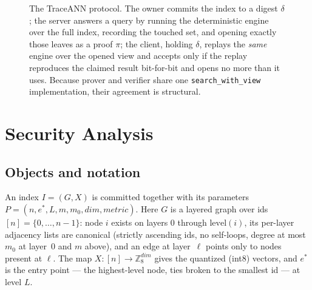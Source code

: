 \documentclass[11pt]{article}
\newcommand{\sys}{TraceANN}
\begin{document}
\begin{figure}[t]\centering
{}
\caption{The \sys{} protocol. The owner commits the index to a digest
$\delta$; the server answers a query by running the deterministic
engine over the full index, recording the touched set, and opening
exactly those leaves as a proof $\pi$; the client, holding $\delta$,
replays the \emph{same} engine over the opened view and accepts only if
the replay reproduces the claimed result bit-for-bit and opens no more
than it uses. Because prover and verifier share one
\texttt{search\_with\_view} implementation, their agreement is
structural.}\label{fig:protocol}
\end{figure}

\section{Security Analysis}\label{sec:security}

\subsection{Objects and notation}

An index $I=(G,X)$ is committed together with its parameters
$P=(n,e^*,L,m,m_0,\mathit{dim},\mathit{metric})$. Here $G$ is a layered
graph over ids $[n]=\{0,\dots,n-1\}$: node $i$ exists on layers $0$
through $\mathrm{level}(i)$, its per-layer adjacency lists are canonical
(strictly ascending ids, no self-loops, degree at most $m_0$ at
layer~$0$ and $m$ above), and an edge at layer~$\ell$ points only to
nodes present at $\ell$. The map $X:[n]\to\mathbb{Z}_{8}^{\mathit{dim}}$
gives the quantized (int8) vectors, and $e^*$ is the entry point --- the
highest-level node, ties broken to the smallest id --- at level $L$.
\end{document}
